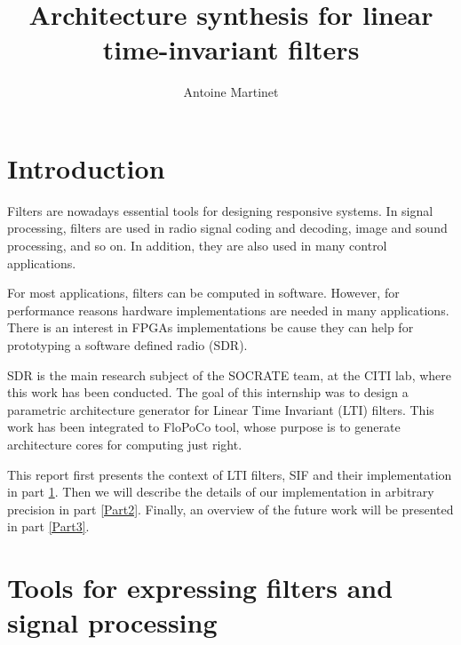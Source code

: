 \documentclass[twoside]{article}
\title{Architecture synthesis for linear time-invariant filters}
\author{Antoine Martinet}
\theoremstyle{remark}
\numberwithin{equation}{subsection}
\newcommand{\TODO}{\textbf{TODO}}
\begin{document}
\maketitle
\newpage
\tableofcontents
\newpage

\section*{ Introduction }

	Filters are nowadays essential tools for designing responsive systems.
	In signal processing, filters are used in
	radio signal coding and decoding, image and sound processing, and so on.
	In addition, they are also used in many control applications.



	For most applications, filters can be computed in software.
	However, for performance reasons hardware implementations are needed in many applications.
	There is an interest in FPGAs implementations be cause they can help for prototyping a software defined radio (SDR).

	
	SDR is the main research subject of the SOCRATE team, at the CITI lab, where this work has been conducted.
	The goal of this internship was to design a parametric architecture generator for Linear Time Invariant (LTI) filters.
	This work has been integrated to FloPoCo tool,
	whose purpose is to generate architecture cores for computing just right.


	This report first presents the context of LTI filters, SIF and their implementation in part \ref{Part1}.
	Then we will describe the details of our implementation in arbitrary precision in part \ref{Part2}.
	Finally, an overview of the future work will be presented in part \ref{Part3}.

\section{Tools for expressing filters and signal processing}
\label{Part1}

\end{document}
